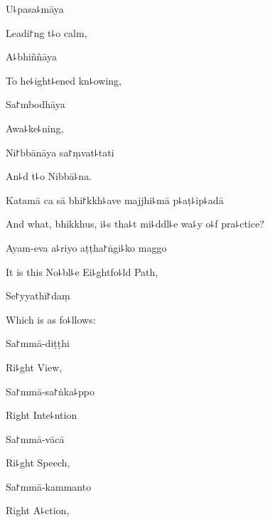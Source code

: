U꜕pasa꜕māya

\begin{english}
  Leadi꜓ng t꜕o calm,
\end{english}

A꜕bhiññāya

\begin{english}
  To he꜕ight꜕ened kn꜕owing,
\end{english}

Sa꜓mbodhāya

\begin{english}
  Awa꜕ke꜕ning,
\end{english}

Ni꜓bbānāya sa꜓ṃvat꜕tati

\begin{english}
  An꜕d t꜕o Nibbā꜕na.
\end{english}

Katamā ca sā bhi꜓kkh꜕ave majjhi꜕mā p꜕aṭ꜕ip꜕adā

\begin{english}
  And what, bhikkhus, i꜕s tha꜕t mi꜕ddl꜕e wa꜕y o꜕f pra꜕ctice?
\end{english}

Ayam-eva a꜕riyo aṭṭha꜓ṅgi꜕ko maggo

\begin{english}
  It is this No꜕bl꜕e Ei꜕ghtfo꜕ld Path,
\end{english}

Se꜓yyathī꜓daṃ

\begin{english}
  Which is as fo꜕llows:
\end{english}

Sa꜓mmā-diṭṭhi

\begin{english}
  Ri꜕ght View,
\end{english}

Sa꜓mmā-sa꜓ṅka꜕ppo

\begin{english}
  Right Inte꜕ntion
\end{english}

Sa꜓mmā-vācā

\begin{english}
  Ri꜕ght Speech,
\end{english}

Sa꜓mmā-kammanto

\begin{english}
  Right A꜕ction,
\end{english}

